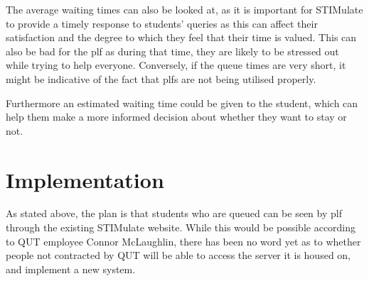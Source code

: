 \documentclass{article}
\begin{document}
{{		The average waiting times can also be looked at, as it is important for STIMulate to provide a timely response to students’ queries as this can affect their satisfaction and the degree to which they feel that their time is valued.  This can also be bad for the \ac{plf} as during that time, they are likely to be stressed out while trying to help everyone. Conversely, if the queue times are very short, it might be indicative of the fact that \ac{plf}s are not being utilised properly. 
		
		Furthermore an estimated waiting time could be given to the student, which can help them make a more informed decision about whether they want to stay or not.
	}
}
\section{Implementation}
{
	As stated above, the plan is that students who are queued can be seen by \ac{plf} through the existing STIMulate website. While this would be possible according to QUT employee Connor McLaughlin, there has been no word yet as to whether people not contracted by QUT will be able to access the server it is housed on, and implement a new system.
}
\end{document}
